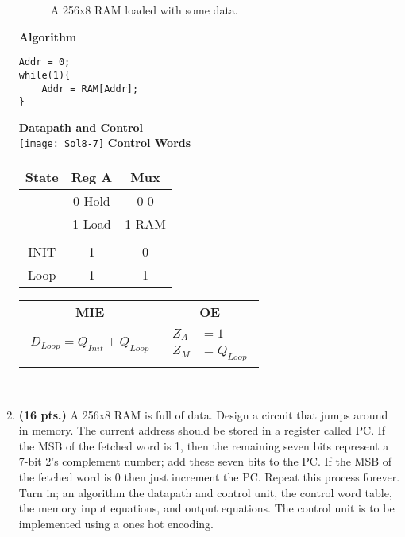 \begin{enumerate}
        \begin{figure}[ht]
            \caption{A 256x8 RAM loaded with some data.}
            \label{fig:RAMhopper}
        \end{figure}
        \begin{onlysolution}[fragile]
            \textbf{Algorithm}
              \begin{verbatim}
Addr = 0;
while(1){
    Addr = RAM[Addr];
}
\end{verbatim}
            \filbreak
            \textbf{Datapath and Control}\\
            \texttt{[image: Sol8-7]}
            \textbf{Control Words}\par
            \begin{tabular}{c|c|c}
                State & Reg A  & Mux   \\ \hline
                & 0 Hold & 0 0   \\ \hline
                & 1 Load & 1 RAM \\ \hline
                &        &       \\ \hline
                INIT  & 1      & 0     \\ \hline
                Loop  & 1      & 1     \\
            \end{tabular}
            \begin{tabular}{cc}
                \textbf{MIE}                   & \textbf{OE} \\
                {$
                    \begin{aligned}
                        D_{Loop} = Q_{Init} + Q_{Loop}
                \end{aligned}$} &
                {$
                    \begin{aligned}
                        Z_A & = 1        \\
                        Z_M & = Q_{Loop}
                \end{aligned}$}
            \end{tabular}\\
        \end{onlysolution}
    \item \textbf{ (16 pts.)}
        A 256x8 RAM is full of data.  Design a circuit that jumps
        around in memory.   The current address should be stored in a
        register called PC.  If the MSB of the fetched word is 1, then the
        remaining seven bits represent a 7-bit 2's complement number;  add these
        seven bits to the PC.  If the MSB of the fetched word is 0 then just
        increment the PC.  Repeat this process forever.
        Turn in; an algorithm the datapath and control unit, the control word
        table, the memory input equations, and output equations.
        The control unit is to be implemented using a ones hot encoding.


\end{enumerate}
